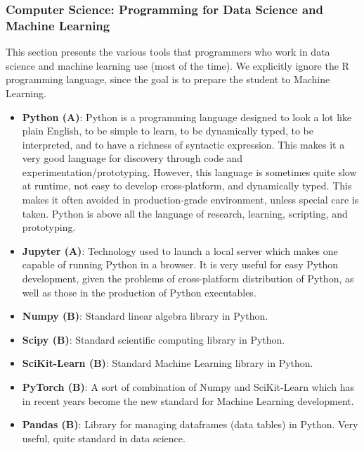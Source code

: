 \documentclass{article}
\begin{document}
\subsubsection*{Computer Science: Programming for Data Science and Machine Learning}

This section presents the various tools that programmers who work in data science and machine learning use (most of the time). We explicitly ignore the R programming language, since the goal is to prepare the student to Machine Learning.

\begin{itemize}
    \item \textbf{Python (A)}: Python is a programming language designed to look a lot like plain English, to be simple to learn, to be dynamically typed, to be interpreted, and to have a richness of syntactic expression. This makes it a very good language for discovery through code and experimentation/prototyping. However, this language is sometimes quite slow at runtime, not easy to develop cross-platform, and dynamically typed. This makes it often avoided in production-grade environment, unless special care is taken. Python is above all the language of research, learning, scripting, and prototyping.
    
    \item \textbf{Jupyter (A)}: Technology used to launch a local server which makes one capable of running Python in a browser. It is very useful for easy Python development, given the problems of cross-platform distribution of Python, as well as those in the production of Python executables.
    
    \item \textbf{Numpy (B)}: Standard linear algebra library in Python.
    
    \item \textbf{Scipy (B)}: Standard scientific computing library in Python.
    
    \item \textbf{SciKit-Learn (B)}: Standard Machine Learning library in Python.

    \item \textbf{PyTorch (B)}: A sort of combination of Numpy and SciKit-Learn which has in recent years become the new standard for Machine Learning development.
    
    \item \textbf{Pandas (B)}: Library for managing dataframes (data tables) in Python. Very useful, quite standard in data science.
    

\end{itemize}
\end{document}
